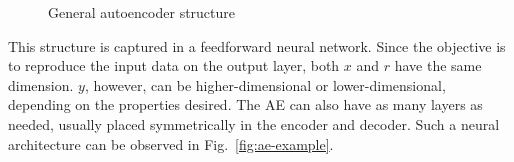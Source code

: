 \begin{figure}[ht!]
\begin{center}
\end{center}
  \caption{General autoencoder structure}
  \label{fig:structure}
\end{figure}

This structure is captured in a feedforward neural network. Since the objective is to reproduce the input data on the output layer, both $x$ and $r$ have the same dimension. $y$, however, can be higher-dimensional or lower-dimensional, depending on the properties desired. The AE can also have as many layers as needed, usually placed symmetrically in the encoder and decoder. Such a neural architecture can be observed in Fig.~\ref{fig:ae-example}.


